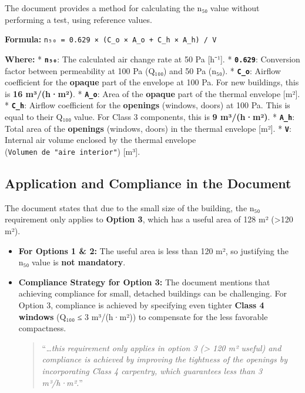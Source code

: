 \documentclass[
  10pt,
  letterpaper,
]{scrbook}
\begin{document}
The document provides a method for calculating the n₅₀ value without
performing a test, using reference values.

\textbf{Formula:}
\texttt{n₅₀\ =\ 0.629\ ×\ (C\_o\ ×\ A\_o\ +\ C\_h\ ×\ A\_h)\ /\ V}

\textbf{Where:} * \textbf{\texttt{n₅₀}}: The calculated air change rate
at 50 Pa {[}h⁻¹{]}. * \textbf{\texttt{0.629}}: Conversion factor between
permeability at 100 Pa (Q₁₀₀) and 50 Pa (n₅₀). * \textbf{\texttt{C\_o}}:
Airflow coefficient for the \textbf{opaque} part of the envelope at 100
Pa. For new buildings, this is \textbf{16 m³/(h·m²)}. *
\textbf{\texttt{A\_o}}: Area of the \textbf{opaque} part of the thermal
envelope {[}m²{]}. * \textbf{\texttt{C\_h}}: Airflow coefficient for the
\textbf{openings} (windows, doors) at 100 Pa. This is equal to their
Q₁₀₀ value. For Class 3 components, this is \textbf{9 m³/(h·m²)}. *
\textbf{\texttt{A\_h}}: Total area of the \textbf{openings} (windows,
doors) in the thermal envelope {[}m²{]}. * \textbf{\texttt{V}}: Internal
air volume enclosed by the thermal envelope
(\texttt{Volumen\ de\ "aire\ interior"}) {[}m³{]}.

\subsection{Application and Compliance in the
Document}\label{application-and-compliance-in-the-document}

The document states that due to the small size of the building, the n₅₀
requirement only applies to \textbf{Option 3}, which has a useful area
of 128 m² (\textgreater120 m²).

\begin{itemize}
\item
  \textbf{For Options 1 \& 2:} The useful area is less than 120 m², so
  justifying the n₅₀ value is \textbf{not mandatory}.
\item
  \textbf{Compliance Strategy for Option 3:} The document mentions that
  achieving compliance for small, detached buildings can be challenging.
  For Option 3, compliance is achieved by specifying even tighter
  \textbf{Class 4 windows} (Q₁₀₀ ≤ 3 m³/(h·m²)) to compensate for the
  less favorable compactness.

  \begin{quote}
  ``\emph{\ldots this requirement only applies in option 3
  (\textgreater{} 120 m² useful) and compliance is achieved by improving
  the tightness of the openings by incorporating Class 4 carpentry,
  which guarantees less than 3 m³/h·m².}''
  \end{quote}
\end{itemize}
\end{document}
